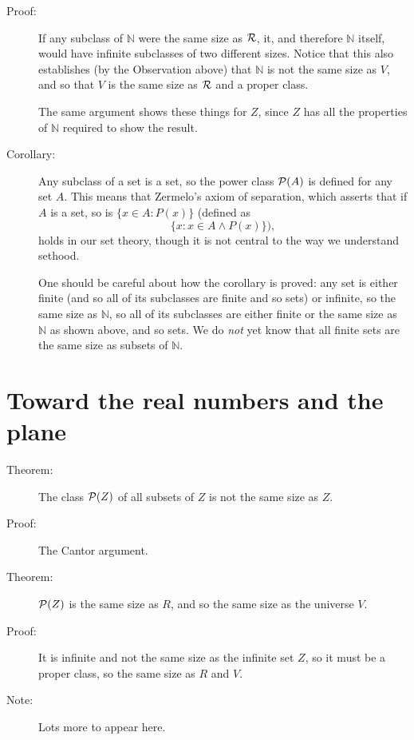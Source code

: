 \documentclass[12pt]{article}
\begin{document}
\begin{description}
\item[Proof:]  If any subclass of $\mathbb N$ were the same size as $\cal R$, it, and therefore $\mathbb N$ itself, would have infinite subclasses of two different sizes.  Notice that this also establishes
(by the Observation above) that $\mathbb N$ is not the same size as $V$, and so that $V$ is the same size as $\cal R$ and a proper class.

The same argument shows these things for $Z$, since $Z$ has all the properties of $\mathbb N$ required to show the result.

\item[Corollary:]  Any subclass of a set is a set, so the power class ${\cal P}(A)$ is defined for any set $A$.   This means that Zermelo's axiom of separation, which asserts
that if $A$ is a set, so is $\{x \in A:P(x)\}$ (defined as $$\{x: x \in A \wedge P(x)\}),$$ holds in our set theory, though it is not central to the way we understand sethood.

One should be careful about how the corollary is proved:  any set is either finite (and so all of its subclasses are finite and so sets) or infinite, so the same size as $\mathbb N$, so all of its subclasses
are either finite or the same size as $\mathbb N$ as shown above, and so sets.  We do {\em not\/} yet know that all finite sets are the same size as subsets of $\mathbb N$.

\end{description}
\section{Toward the real numbers and the plane}

\begin{description}

\item[Theorem:]  The class ${\cal P}(Z)$ of all subsets of $Z$ is not the same size as $Z$.

\item[Proof:]  The Cantor argument.

\item[Theorem:]  ${\cal P}(Z)$ is the same size as $R$, and so the same size as the universe $V$.

\item[Proof:]  It is infinite and not the same size as the infinite set $Z$, so it must be a proper class, so the same size as $R$ and $V$.

\item[Note:]  Lots more to appear here.

\end{description}
\end{document}
